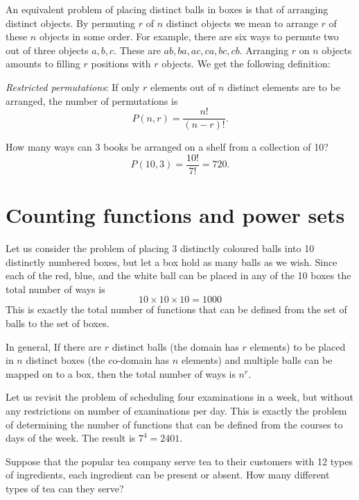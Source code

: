 An equivalent problem of placing distinct balls in boxes is that of arranging distinct objects. By permuting $r$ of $n$ distinct objects we mean to arrange $r$ of these $n$ objects in some order. For example, there are six ways to permute two out of three objects $a,b,c$. These are $ab,ba,ac,ca,bc,cb$. Arranging $r$ on $n$ objects amounts to filling $r$ positions with $r$ objects. We get the following definition:
\begin{definition}
\emph{Restricted permutations}: If only $r$ elements out of $n$ distinct elements are to be arranged, the number of permutations is
\[
P(n,r) = \frac{n!}{(n-r)!}.
\]
\end{definition}

\begin{example}
How many ways can 3 books be arranged on a shelf from a collection of 10?  
\[
P(10,3) = \frac{10!}{7!} = 720.
\]
\end{example}

\section{Counting functions and power sets}

Let us consider the problem of placing 3 distinctly coloured balls into 10 distinctly numbered boxes, but let a box hold as many balls as we wish. Since each of the red, blue, and the white ball can be placed in any of the 10 boxes the total number of ways is
\[
10 \times 10 \times 10 = 1000
\]
This is exactly the total number of functions that can be defined from the set of balls to the set of boxes.

In general, If there are $r$ distinct balls (the domain has $r$ elements) to be placed in $n$ distinct boxes (the co-domain has $n$ elements) and multiple balls can be mapped on to a box, then the total number of ways is $n^r$.

\begin{example}
Let us revisit the problem of scheduling four examinations in a week, but without any restrictions on number of examinations per day. This is exactly the problem of determining the number of functions that can be defined from the
courses to days of the week. The result is $7^4 = 2401$.
\end{example}

\begin{exercise}
Suppose that the popular tea company serve tea to their customers with 12 types of ingredients, each ingredient can be present or absent. How many different types of tea can they serve? 
\end{exercise}

